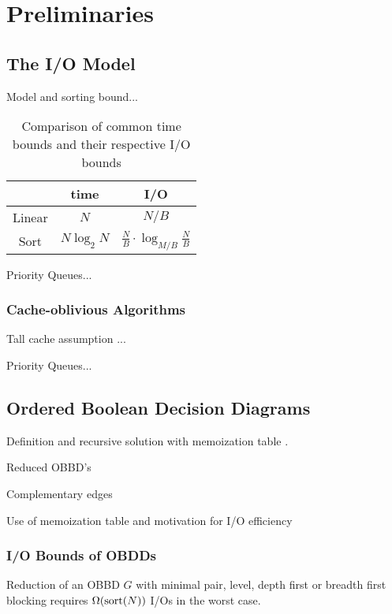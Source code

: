 \section{Preliminaries} \label{sec:preliminaries}

\subsection{The I/O Model}
Model and sorting bound... \cite{Aggarwal87}

\begin{table}[ht!]
  \centering
  
  \begin{tabular}{c|c|c}
           & time         & I/O
    \\ \hline
    Linear & $N$          & $N/B$
    \\
    Sort   & $N \log_2 N$ & $\tfrac{N}{B} \cdot \log_{M/B} \tfrac{N}{B}$
  \end{tabular}
  
  \caption{Comparison of common time bounds and their respective I/O bounds}
  \label{tab:time_vs_io}
\end{table}

Priority Queues... \cite{Arge04}

\subsubsection{Cache-oblivious Algorithms}
Tall cache assumption ...

Priority Queues... \cite{Arge07, Sanders2001}

\subsection{Ordered Boolean Decision Diagrams}
Definition and recursive solution with memoization table \cite{Bryant86,
  Brace90, Dijk16}.

Reduced OBBD's \cite[Definition2]{Bryant86}

Complementary edges \cite{Brace90}

Use of memoization table and motivation for I/O efficiency \todocite


\subsubsection{I/O Bounds of OBDDs}
\begin{theorem} \label{thm:reduce_io_lower_bound}

  Reduction of an OBBD $G$ with minimal pair, level, depth first or breadth
  first blocking requires $\Omega(\text{sort}(N))$ I/Os in the worst case.
\end{theorem}

